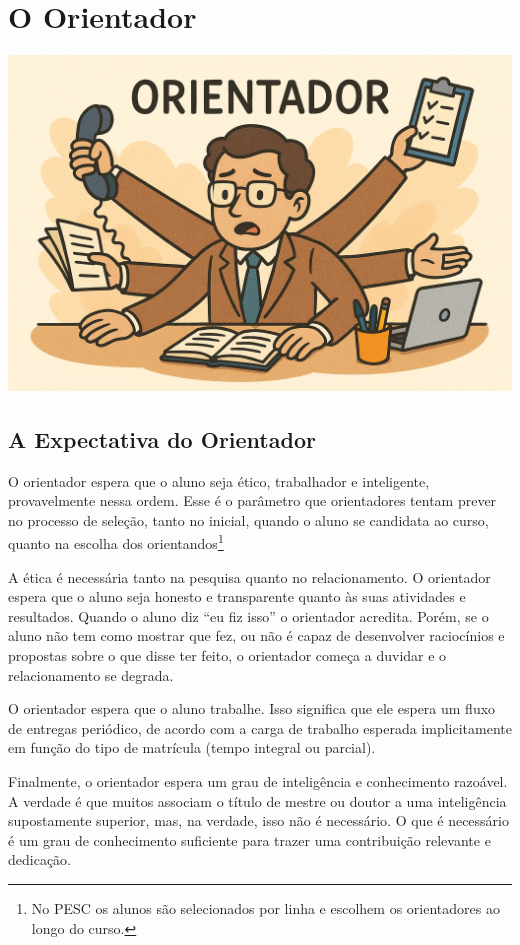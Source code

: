 \chapter{O Orientador}

\begin{center}
\includegraphics[width=0.5\linewidth]{Images/orientador.png}    
\end{center}
\vspace{0.5cm}

\section{A Expectativa do Orientador}

O orientador espera que o aluno seja ético, trabalhador e inteligente, provavelmente nessa ordem. 
Esse é o parâmetro que orientadores tentam prever no processo de seleção, tanto no inicial, quando o aluno se candidata ao curso, quanto na escolha dos orientandos\footnote{No PESC os alunos são selecionados por linha e escolhem os orientadores ao longo do curso.}

A ética é necessária tanto na pesquisa quanto no relacionamento. O orientador espera que o aluno seja honesto e transparente quanto às suas atividades e resultados.
Quando o aluno diz ``eu fiz isso'' o orientador acredita. Porém, se o aluno não tem como mostrar que fez, ou não é capaz de desenvolver raciocínios e propostas sobre o que disse ter feito, o orientador começa a duvidar e o relacionamento se degrada.

O orientador espera que o aluno trabalhe. Isso significa que ele espera um fluxo de entregas periódico, de acordo com a carga de trabalho esperada implicitamente em função do tipo de matrícula (tempo integral ou parcial). 

Finalmente, o orientador espera um grau de inteligência e conhecimento razoável. A verdade é que muitos associam o título de mestre ou doutor a uma inteligência  supostamente superior, mas, na verdade, isso não é necessário. O que é necessário é um grau de conhecimento suficiente para trazer uma contribuição relevante e dedicação. 

